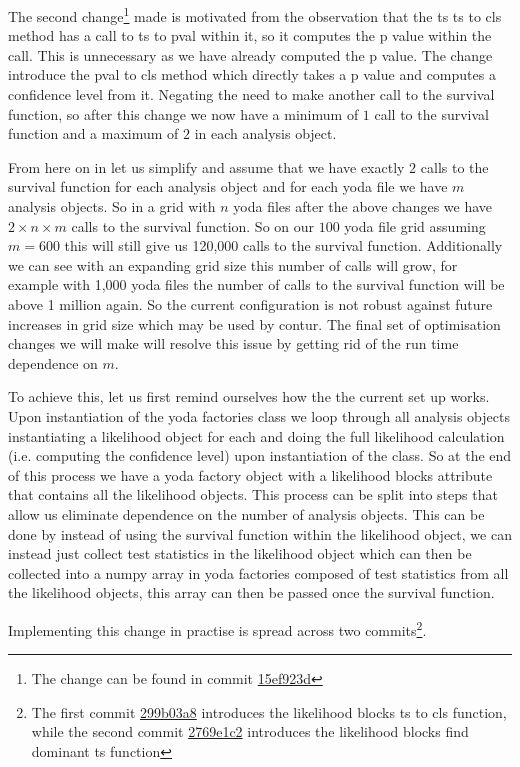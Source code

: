 The second change\footnote{The change can be found in commit \href{https://gitlab.com/hepcedar/contur/-/commit/15ef923de401ced56f3186ed3bf6528c7d46f890}{15ef923d}} made is motivated from the observation that the ts ts to cls method has a call to ts to pval within it, so it computes the p value within the call. This is unnecessary as we have already computed the p value. The change introduce the pval to cls method which directly takes a p value and computes a confidence level from it. Negating the need to make another call to the survival function, so after this change we now have a minimum of $1$ call to the survival function and a maximum of $2$ in each analysis object.

From here on in let us simplify and assume that we have exactly $2$ calls to the survival function for each analysis object and for each yoda file we have $m$ analysis objects. So in a grid with $n$ yoda files after the above changes we have $2\times n\times m$ calls to the survival function. So on our $100$ yoda file grid assuming $m=600$ this will still give us 120,000 calls to the survival function. Additionally we can see with an expanding grid size this number of calls will grow, for example with 1,000 yoda files the number of calls to the survival function will be above 1 million again. So the current configuration is not robust against future increases in grid size which may be used by contur. The final set of optimisation changes we will make will resolve this issue by getting rid of the run time dependence on $m$.

To achieve this, let us first remind ourselves how the the current set up works. Upon instantiation of the yoda factories class we loop through all analysis objects instantiating a likelihood object for each and doing the full likelihood calculation (i.e. computing the confidence level) upon instantiation of the class. So at the end of this process we have a yoda factory object with a likelihood blocks attribute that contains all the likelihood objects. This process can be split into steps that allow us eliminate dependence on the number of analysis objects. This can be done by instead of using the survival function within the likelihood object, we can instead just collect test statistics in the likelihood object which can then be collected into a numpy array in yoda factories composed of test statistics from all the likelihood objects, this array can then be passed once the survival function.

Implementing this change in practise is spread across two commits\footnote{The first commit \href{https://gitlab.com/hepcedar/contur/-/commit/299b03a86812b47e30ed66d4f82a59a3584cf523}{299b03a8} introduces the likelihood blocks ts to cls function, while the second commit \href{https://gitlab.com/hepcedar/contur/-/commit/2769e1c2a020efd2de2919db2413309eef8a8e64}{2769e1c2} introduces the likelihood blocks find dominant ts function }. 

